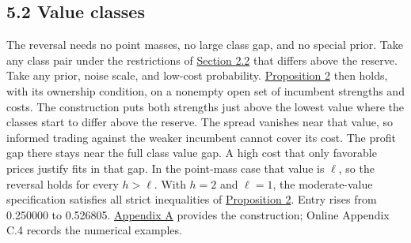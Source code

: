 \subsection{5.2 Value classes}\label{sec-acquisition-values}

The reversal needs no point masses, no large class gap, and no
special prior. Take any class pair under the restrictions of
\hyperref[sec-values-preparation-and-the-sale]{Section 2.2} that
differs above the reserve. Take any prior, noise scale, and low-cost
probability. \hyperref[result-proposition-2]{Proposition 2} then
holds, with its ownership condition, on a nonempty open set of
incumbent strengths and costs. The construction puts both strengths
just above the lowest value where the classes start to differ above
the reserve. The spread vanishes near that value, so informed trading
against the weaker incumbent cannot cover its cost. The profit gap
there stays near the full class value gap. A high cost that only
favorable prices justify fits in that gap. In the point-mass case
that value is \(\ell\), so the reversal holds for every \(h>\ell\). With
\(h=2\) and \(\ell=1\), the moderate-value specification satisfies all
strict inequalities of \hyperref[result-proposition-2]{Proposition 2}.
Entry rises from 0.250000 to 0.526805.
\hyperref[paper-appendix]{Appendix A} provides the construction; Online
Appendix C.4 records the numerical examples.

